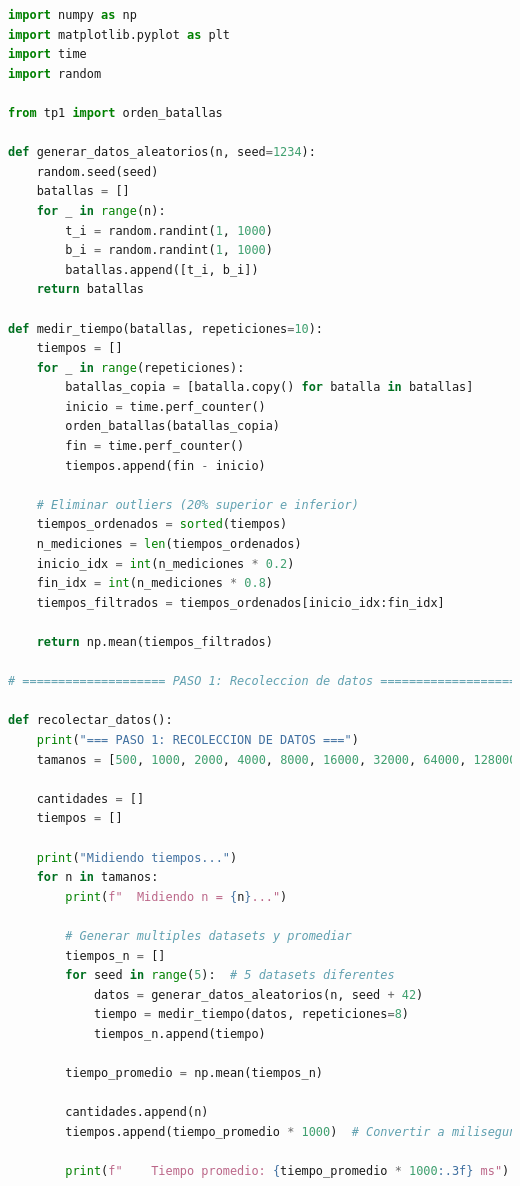 \begin{lstlisting}[language=Python, caption=Código para ajuste por mínimos cuadrados]
import numpy as np
import matplotlib.pyplot as plt
import time
import random

from tp1 import orden_batallas

def generar_datos_aleatorios(n, seed=1234):
    random.seed(seed)
    batallas = []
    for _ in range(n):
        t_i = random.randint(1, 1000)
        b_i = random.randint(1, 1000)
        batallas.append([t_i, b_i])
    return batallas

def medir_tiempo(batallas, repeticiones=10):
    tiempos = []
    for _ in range(repeticiones):
        batallas_copia = [batalla.copy() for batalla in batallas]
        inicio = time.perf_counter()
        orden_batallas(batallas_copia)
        fin = time.perf_counter()
        tiempos.append(fin - inicio)
    
    # Eliminar outliers (20% superior e inferior)
    tiempos_ordenados = sorted(tiempos)
    n_mediciones = len(tiempos_ordenados)
    inicio_idx = int(n_mediciones * 0.2)
    fin_idx = int(n_mediciones * 0.8)
    tiempos_filtrados = tiempos_ordenados[inicio_idx:fin_idx]
    
    return np.mean(tiempos_filtrados)

# ==================== PASO 1: Recoleccion de datos ==================== #

def recolectar_datos():
    print("=== PASO 1: RECOLECCION DE DATOS ===")
    tamanos = [500, 1000, 2000, 4000, 8000, 16000, 32000, 64000, 128000, 256000, 512000, 1024000, 2048000]
    
    cantidades = []
    tiempos = []
    
    print("Midiendo tiempos...")
    for n in tamanos:
        print(f"  Midiendo n = {n}...")
        
        # Generar multiples datasets y promediar
        tiempos_n = []
        for seed in range(5):  # 5 datasets diferentes
            datos = generar_datos_aleatorios(n, seed + 42)
            tiempo = medir_tiempo(datos, repeticiones=8)
            tiempos_n.append(tiempo)
        
        tiempo_promedio = np.mean(tiempos_n)
        
        cantidades.append(n)
        tiempos.append(tiempo_promedio * 1000)  # Convertir a milisegundos
        
        print(f"    Tiempo promedio: {tiempo_promedio * 1000:.3f} ms")
    

\end{lstlisting}
